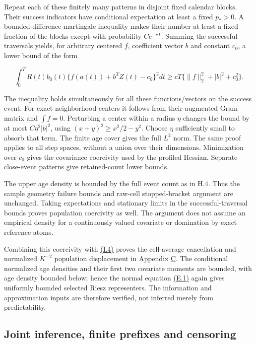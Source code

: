 \documentclass[11pt]{article}
\begin{document}
Repeat each of these finitely many patterns in disjoint fixed calendar blocks. Their success indicators have conditional expectation at least a fixed \(p_*>0\). A bounded-difference martingale inequality makes their number at least a fixed fraction of the blocks except with probability \(Ce^{-cT}\). Summing the successful traversals yields, for arbitrary centered \(f\), coefficient vector \(b\) and constant \(c_0\), a lower bound of the form

\begin{equation*}
\int_0^T R(t)b_0(t)
 \{f(a(t))+b^TZ(t)-c_0\}^2dt
 \geq cT\{\|f\|_2^2+|b|^2+c_0^2\}.
\tag{I.5}\label{eq:I.5}
\end{equation*}

The inequality holds simultaneously for all these functions/vectors on the success event. For exact neighborhood centers it follows from their augmented Gram matrix and \(\int f=0\). Perturbing a center within a radius \(\eta\) changes the bound by at most \(C\eta^2|b|^2\), using \((x+y)^2\geq x^2/2-y^2\). Choose \(\eta\) sufficiently small to absorb that term. The finite age cover gives the full \(L^2\) norm. The same proof applies to all step spaces, without a union over their dimensions. Minimization over \(c_0\) gives the covariance coercivity used by the profiled Hessian. Separate close-event patterns give retained-count lower bounds.

The upper age density is bounded by the full event count as in H.4. Thus the sample geometry failure bounds and raw-cell stopped-bracket argument are unchanged. Taking expectations and stationary limits in the successful-traversal bounds proves population coercivity as well. The argument does not assume an empirical density for a continuously valued covariate or domination by exact reference atoms.

Combining this coercivity with \hyperref[eq:I.4]{(I.4)} proves the cell-average cancellation and normalized \(K^{-2}\) population displacement in Appendix \hyperref[sec:C]{C}. The conditional normalized age densities and their first two covariate moments are bounded, with age density bounded below; hence the normal equation \hyperref[eq:E.1]{(E.1)} again gives uniformly bounded selected Riesz representers. The information and approximation inputs are therefore verified, not inferred merely from predictability.

\subsection{Joint inference, finite prefixes and censoring}\label{sec:I.5}
\end{document}
